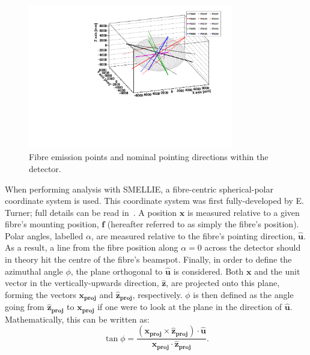 \begin{figure}
    \centering
    \includegraphics[width=0.8\textwidth]{3_SMELLIEHardware/images/fibre_positions.pdf}
    \caption[Fibre emission points and nominal pointing directions]
    {Fibre emission points and nominal pointing directions within the detector.}
    \label{fig:smellie_pos_dirs}
\end{figure}

When performing analysis with SMELLIE, a fibre-centric spherical-polar coordinate system is used. This coordinate system was first fully-developed by E. Turner; full details can be read in~\cite{turnerMeasurementScatteringCharacteristics2022}. A position $\bm{x}$ is measured relative to a given fibre's mounting position, $\bm{f}$ (hereafter referred to as simply the fibre's position). Polar angles, labelled $\alpha$, are measured relative to the fibre's pointing direction, $\bm{\hat{u}}$. As a result, a line from the fibre position along $\alpha = 0$ across the detector should in theory hit the centre of the fibre's beamspot. Finally, in order to define the azimuthal angle $\phi$, the plane orthogonal to $\bm{\hat{u}}$ is considered. Both $\bm{x}$ and the unit vector in the vertically-upwards direction, $\bm{\hat{z}}$, are projected onto this plane, forming the vectors $\bm{x_{proj}}$ and $\bm{\hat{z}_{proj}}$, respectively. $\phi$ is then defined as the angle going from $\bm{\hat{z}_{proj}}$ to $\bm{x_{proj}}$ if one were to look at the plane in the direction of $\bm{\hat{u}}$. Mathematically, this can be written as:
\begin{equation}
    \tan\phi = \frac{
        \left(\bm{x_{proj}}\times\bm{\hat{z}_{proj}}\right)\cdot\bm{\hat{u}}
        }{\bm{x_{proj}}\cdot\bm{\hat{z}_{proj}}}.
\end{equation}

